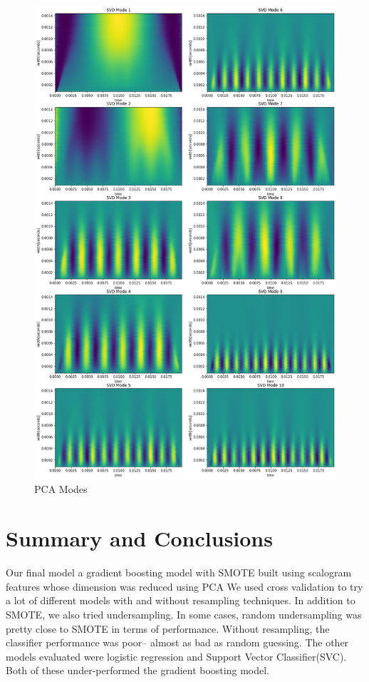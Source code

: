 \documentclass{article}
\begin{document}
\begin{figure}
    \centering
    \includegraphics[width=0.8\linewidth]{pca_modes.png}
    \caption{PCA Modes}
    \label{fig:modes}
\end{figure}

\section{Summary and Conclusions}
Our final model a gradient boosting model with SMOTE built using scalogram
features whose dimension was reduced using PCA
We used cross validation to try a lot of different models with and without
resampling techniques. In addition to SMOTE, we also tried undersampling.
In some cases, random undersampling was pretty close to SMOTE in terms of
performance. Without resampling, the classifier performance was poor-- almost as
bad as random guessing.
The other models evaluated were logistic
regression and Support Vector Classifier(SVC). Both of these under-performed the
gradient boosting model.
\end{document}
